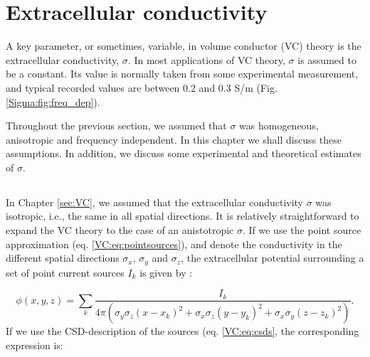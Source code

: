 \section{Extracellular conductivity}
\label{sec:Sigma}

A key parameter, or sometimes, variable, in volume conductor (VC) theory is the extracellular conductivity, $\sigma$. In most applications of VC theory, $\sigma$ is assumed to be a constant. Its value is normally taken from some experimental measurement, and typical recorded values are between 0.2 and 0.3 S/m (Fig. \ref{Sigma:fig:freq_dep}).  

Throughout the previous section, we assumed that  $\sigma$  was homogeneous, anisotropic and frequency independent. In this chapter we shall discuss these assumptions. In addition, we discuss some experimental and theoretical estimates of  $\sigma$. 


\subsection{}
\label{sec:Sigma:Anisotropic}

In Chapter \ref{sec:VC}, we assumed that the extracellular conductivity $\sigma$ was isotropic, i.e., the same in all spatial directions. It is relatively straightforward to expand the VC theory to the case of an anistotropic $\sigma$. If we use the point source approximation (eq. \ref{VC:eq:pointsources}), and denote the conductivity in the different spatial directions $\sigma_x$, $\sigma_y$ and $\sigma_z$, the extracellular potential surrounding a set of point current sources $I_k$ is given by \citep{nicholson1975, Pettersen2012}:

\begin{equation}
\phi(x,y,z) = \sum_k \frac{I_k}{4\pi(\sigma_y\sigma_z (x-x_k)^2 + \sigma_x\sigma_z (y-y_k)^2 + \sigma_x\sigma_y (z-z_k)^2)}.
\label{Sigma:eq:Panisos}
\end{equation}
If we use the CSD-description of the sources (eq. \ref{VC:eq:csds}, the corresponding expression is:

